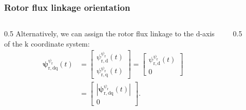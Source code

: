 \begin{frame}
    \frametitle{Rotor flux linkage orientation}
    \begin{columns}
        \begin{column}{0.5\textwidth}
            Alternatively, we can assign the rotor flux linkage to the $\mathrm{d}$-axis of the $\mathrm{k}$ coordinate system:
            \begin{equation}
                \renewcommand{\arraystretch}{1.4}
                \begin{split}
                    \bm{\psi}^{\psi_{\mathrm{r}}}_\mathrm{r,dq}(t) & = \begin{bmatrix} \psi_{\mathrm{r,d}}^{\psi_{\mathrm{r}}}(t) \\ \psi_{\mathrm{r,q}}^{\psi_{\mathrm{r}}}(t) \end{bmatrix} = \begin{bmatrix} \psi_{\mathrm{r,d}}^{\psi_{\mathrm{r}}}(t) \\ 0 \end{bmatrix} \\
                                                                   & = \begin{bmatrix}|\bm{\psi}^{\psi_{\mathrm{r}}}_\mathrm{r,dq}(t)| \\ 0 \end{bmatrix}.
                \end{split}
                \label{eq:IM_model_k_rotor_flux_orientation_def}
            \end{equation}
        \end{column}
        \begin{column}{0.5\textwidth}
            \begin{figure}
                \centering
                \begin{tikzpicture}[>=Latex]


\end{tikzpicture}
\end{figure}
\end{column}
\end{columns}
\end{frame}

